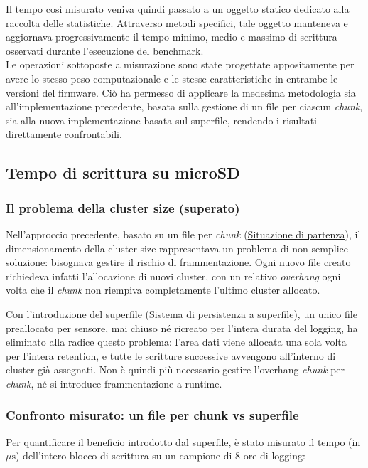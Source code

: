 Il tempo così misurato veniva quindi passato a un oggetto statico dedicato alla
raccolta delle statistiche. Attraverso metodi specifici, tale oggetto manteneva
e aggiornava progressivamente il tempo minimo, medio e massimo di scrittura osservati 
durante l'esecuzione del benchmark. \\

Le operazioni sottoposte a misurazione sono state progettate appositamente per
avere lo stesso peso computazionale e le stesse caratteristiche in entrambe le
versioni del firmware. Ciò ha permesso di applicare la medesima metodologia sia
all'implementazione precedente, basata sulla gestione di un file per ciascun
\textit{chunk}, sia alla nuova implementazione basata sul superfile, rendendo i risultati
direttamente confrontabili.


\subsection{Tempo di scrittura su microSD}
\label{subsec:tempo_scrittura_sd}

\subsubsection{Il problema della cluster size (superato)}
\label{subsubsec:problema_cluster_size}
Nell'approccio precedente, basato su un file per \textit{chunk} 
(\hyperref[sec:situazione-partenza]{Situazione di partenza}), il
dimensionamento della cluster size rappresentava un problema di non semplice
soluzione: bisognava gestire il rischio di frammentazione. Ogni nuovo file creato
richiedeva infatti l'allocazione di nuovi cluster, con un relativo \textit{overhang}
ogni volta che il \textit{chunk} non riempiva completamente l'ultimo cluster
allocato.

Con l'introduzione del superfile (\hyperref[sec:superfile]{Sistema di
persistenza a superfile}), un unico file preallocato per sensore, mai chiuso
né ricreato per l'intera durata del logging, ha eliminato alla radice questo
problema: l'area dati viene allocata una sola volta per l'intera retention,
e tutte le scritture successive avvengono all'interno di cluster già
assegnati. Non è quindi più necessario gestire l'overhang \textit{chunk} per \textit{chunk},
né si introduce frammentazione a runtime.


\subsubsection{Confronto misurato: un file per chunk vs superfile}
\label{subsubsec:confronto_scrittura}
Per quantificare il beneficio introdotto dal superfile, è stato misurato il
tempo (in $\mu\mathrm{s}$) dell'intero blocco di scrittura su un campione di 8 
ore di logging:

